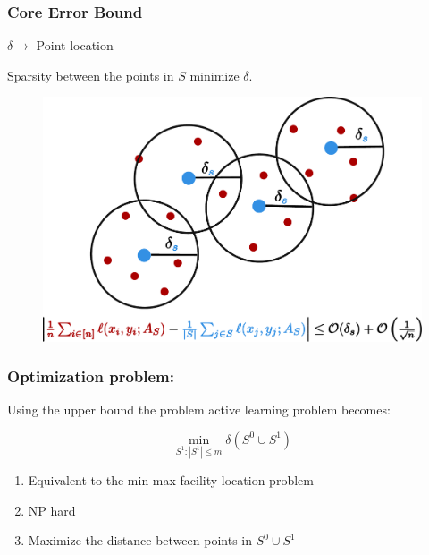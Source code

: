 \documentclass[11pts]{beamer}
\begin{document}
\begin{frame}%
\frametitle{Core Error Bound}
\begin{center}
  $    \delta \longrightarrow$ Point  location  
\end{center}

Sparsity between the points in $S$ minimize $\delta$.
\begin{figure}
    \centering
    \includegraphics[scale=0.35]{IM/DELTA.pdf}
\end{figure}
\end{frame}

\begin{frame}%
\frametitle{Optimization problem:}

 Using the upper bound the problem active learning problem becomes:
 
 \begin{equation}
     \min_{S^{1}:|S^{1}|\leq m} \delta(S^{0}\cup S^{1})
 \end{equation}
\begin{enumerate}[\color{bar}\bfseries $\bullet$]
    \item Equivalent to the min-max facility location problem
    \item NP hard
    \item Maximize the distance between points in $S^{0}\cup S^{1}$
\end{enumerate}
 
\end{frame}
\end{document}
